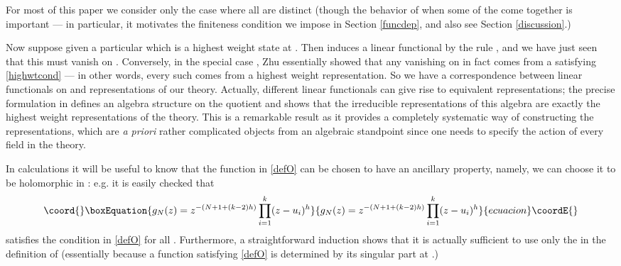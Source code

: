 \documentclass[a4paper,12pt]{article}
\providecommand{\C}{{\mathbb C}}
\providecommand{\uu}{{\mathbf u}}
\providecommand{\F}{{\mathcal H}}
\providecommand{\OO}{{\mathcal O}}
\providecommand{\V}{{\mathcal V}}
\providecommand{\IP}[1]{\langle#1\rangle}
\providecommand{\ti}[1]{\textit{#1}}
\begin{document}
For most of this paper we consider only the case where all \coordHE{} are distinct (though the behavior
of \myHighlight{$O_\uu$}\coordHE{} when some of the \coordHE{} come together is important --- in particular, it motivates
the finiteness condition we impose in Section \ref{funcdep}, and also see Section \ref{discussion}.)

Now suppose given a particular \myHighlight{$\Sigma$}\coordHE{} which is a highest weight state at \myHighlight{$\uu$}\coordHE{}.  Then \myHighlight{$\Sigma$}\coordHE{} induces
a linear functional \myHighlight{$\eta: \F \to \C$}\coordHE{} by the rule
\myHighlight{$\eta(\chi) = \IP{\Sigma \chi}$}\coordHE{}, and we have just seen that this \myHighlight{$\eta$}\coordHE{} must vanish
on \myHighlight{$O_\uu$}\coordHE{}.  Conversely, in the special case \coordHE{}, Zhu essentially showed that 
any \myHighlight{$\eta: \F \to \C$}\coordHE{} vanishing on \myHighlight{$O_\uu$}\coordHE{}
in fact comes from a \myHighlight{$\Sigma \in \V^\OO$}\coordHE{} satisfying \eqref{highwtcond} --- in other words, every such \myHighlight{$\eta$}\coordHE{} comes from a 
highest weight representation.
So we have a correspondence between linear functionals on \myHighlight{$\F / O_\uu$}\coordHE{} and representations of our theory.  Actually, different linear functionals
can give rise to equivalent representations; the precise formulation in \cite{Zhu}
defines an algebra structure on the quotient \myHighlight{$\F / O_\uu$}\coordHE{} and shows that the irreducible 
representations of this algebra are
exactly the highest weight representations of the theory.  This is a 
remarkable result as it provides a completely systematic way of constructing
the representations, which are \ti{a priori} rather complicated objects from an algebraic standpoint 
since one needs to specify the action of every field in the theory.

In calculations it will be useful to know that the function \coordHE{} in \eqref{defO} can be chosen to
have an ancillary property, namely, we can choose it to be holomorphic in \myHighlight{$\uu$}\coordHE{}:  e.g. it is easily checked
that
\begin{equation}\coord{}\boxEquation{ \label{fchoice}
g_N(z) = z^{-(N+1+(k-2)h)} \prod_{i=1}^k (z-u_i)^h
}{ g_N(z) = z^{-(N+1+(k-2)h)} \prod_{i=1}^k (z-u_i)^h
}{ecuacion}\coordE{}\end{equation}
satisfies the condition in \eqref{defO} for all \coordHE{}.  Furthermore, a straightforward induction shows that it is
actually sufficient to use only the \coordHE{} in the definition of \myHighlight{$O_\uu$}\coordHE{} 
(essentially because a function satisfying \eqref{defO} is determined
by its singular part at \coordHE{}.)
\end{document}
